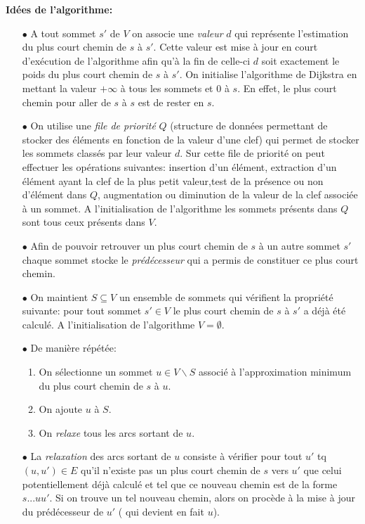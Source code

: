 \noindent \textbf{Idées de l'algorithme:}\\
\begin{enumerate}
	
	\item[$\bullet$] A tout sommet $s'$ de $V$ on associe une \textit{valeur} $d$ qui représente l'estimation du plus court chemin de $s$ à $s'$. Cette valeur est mise à jour en court d'exécution de l'algorithme afin qu'à la fin de celle-ci $d$ soit exactement le poids du plus court chemin de $s$ à $s'$. On initialise l'algorithme de Dijkstra en mettant la valeur $+\infty$ à tous les sommets et $0$ à $s$. En effet, le plus court chemin pour aller de $s$ à $s$ est de rester en $s$.
	
	\item[$\bullet$] On utilise une \textit{file de priorité} $Q$ (structure de données permettant de stocker des éléments en fonction de la valeur d'une clef) qui permet de stocker les sommets classés par leur valeur $d$. Sur cette file de priorité on peut effectuer les opérations suivantes: insertion d'un élément, extraction d'un élément ayant la clef de la plus petit valeur,test de la présence ou non d'élément dans $Q$, augmentation ou diminution de la valeur de la clef associée à un sommet. A l'initialisation de l'algorithme les sommets présents dans $Q$ sont tous ceux présents dans $V$.
	
	\item[$\bullet$] Afin de pouvoir retrouver un plus court chemin de $s$ à un autre sommet $s'$ chaque sommet stocke le \textit{prédécesseur} qui a permis de constituer ce plus court chemin.
	
	\item[$\bullet$] On maintient $S \subseteq V$ un ensemble de sommets qui vérifient la propriété suivante: pour tout sommet $s'\in V$ le plus court chemin de $s$ à $s'$ a déjà été calculé. A l'initialisation de l'algorithme $V = \emptyset$.
	
	\item[$\bullet$]De manière répétée: \begin{enumerate}
										\item On sélectionne un sommet $u \in V \backslash S$ associé à l'approximation minimum du plus court chemin de $s$ à $u$.
										\item On ajoute $u$ à $S$.
										\item On \textit{relaxe} tous les arcs sortant de $u$.
									\end{enumerate}
	\item[$\bullet$] La \textit{relaxation} des arcs sortant de $u$ consiste à vérifier pour tout $u'$ tq $(u,u')\in E$ qu'il n'existe pas un plus court chemin de $s$ vers $u'$ que celui potentiellement déjà calculé et tel que ce nouveau chemin est de la forme $s ... uu'$. Si on trouve un tel nouveau chemin, alors on procède à la mise à jour du prédécesseur de $u'$ ( qui devient en fait $u$).
\end{enumerate}
$\text{}$\\

